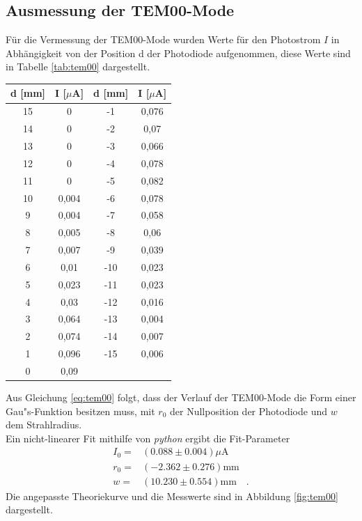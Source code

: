 \documentclass[]{scrartcl}
\begin{document}
\subsection{Ausmessung der TEM00-Mode}
Für die Vermessung der TEM00-Mode wurden Werte für den Photostrom $I$ in Abhängigkeit von der Position d der Photodiode aufgenommen, diese Werte sind in Tabelle \ref{tab:tem00} dargestellt.
\begin{center}
	\begin{tabular}{|c|c||c|c|}
		\hline d [mm] & I [$\mu$A] & d [mm] & I [$\mu$A]\\
		\hline	15	&	0	&	-1	&	0,076	\\
				14	&	0	&	-2	&	0,07	\\
				13	&	0	&	-3	&	0,066	\\
				12	&	0	&	-4	&	0,078	\\
				11	&	0	&	-5	&	0,082	\\
				10	&	0,004	&	-6	&	0,078	\\
				9	&	0,004	&	-7	&	0,058	\\
				8	&	0,005	&	-8	&	0,06	\\
				7	&	0,007	&	-9	&	0,039	\\
				6	&	0,01	&	-10	&	0,023	\\
				5	&	0,023	&	-11	&	0,023	\\
				4	&	0,03	&	-12	&	0,016	\\
				3	&	0,064	&	-13	&	0,004	\\
				2	&	0,074	&	-14	&	0,007	\\
				1	&	0,096	&	-15	&	0,006	\\
				0	&	0,09	&		&		\\
		\hline
	\end{tabular}
	\label{tab:tem00}
\end{center}
Aus Gleichung \ref{eq:tem00} folgt, dass der Verlauf der TEM00-Mode die Form einer Gau"s-Funktion besitzen muss, mit $r_0$ der Nullposition der Photodiode und $w$ dem Strahlradius. \\
Ein nicht-linearer Fit mithilfe von \textit{python} ergibt die Fit-Parameter
\begin{align*}
I_0=& (0.088 \pm 0.004) \si{\mu\ampere}\\
r_0=& (-2.362 \pm 0.276) \si{\milli\metre}\\
w=&  (10.230  \pm 0.554) \si{\milli\metre}\quad.
\end{align*}
Die angepasste Theoriekurve und die Messwerte sind in Abbildung \ref{fig:tem00} dargestellt.
\end{document}
